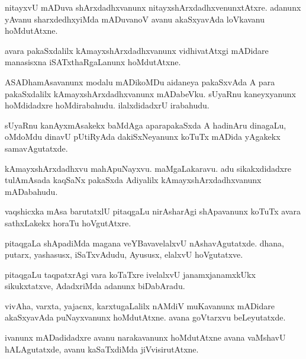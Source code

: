 \documentclass{article}
\begin{document}
\begin{mng}%
nitayxvU mADuva shArxdadhxvanunx nitayxshArxdadhxvenunxtAtxre. adanunx
yAvanu sharxdedhxyiMda mADuvanoV avanu akaSxyavAda loVkavanu
hoMdutAtxne.
\end{mng}

\begin{mng}%
avara pakaSxdalilx kAmayxshArxdadhxvanunx vidhivatAtxgi mADidare
manasisxna iSATxthaRgaLanunx hoMdutAtxne.
\end{mng}

\begin{mng}%
ASADhamAsavanunx modalu mADikoMDu aidaneya pakaSxvAda
A para pakaSxdalilx kAmayxshArxdadhxvanunx mADabeVku. sUyaRnu kaneyxyanunx
hoMdidadxre hoMdirabahudu. ilalxdidadxrU irabahudu.
\end{mng}

\begin{mng}%
sUyaRnu kanAyxmAsakekx baMdAga aparapakaSxda A hadinAru
dinagaLu, oMdoMdu dinavU pUtiRyAda dakiSxNeyanunx koTuTx mADida yAgakekx samavAgutatxde.
\end{mng}

\begin{mng}%
kAmayxshArxdadhxvu mahApuNayxvu. maMgaLakaravu. adu sikakxdidadxre
tulAmAsada kaqSaNx pakaSxda Adiyalilx kAmayxshArxdadhxvanunx mADabahudu.
\end{mng}

\begin{mng}%
vaqshicxka mAsa barutatxlU pitaqgaLu nirAsharAgi shApavanunx
koTuTx avara sathxLakekx horaTu hoVgutAtxre.
\end{mng}

\begin{mng}%
pitaqgaLa shApadiMda magana veYBavavelalxvU nAshavAgutatxde. dhana,
putarx, yashasusx, iSaTxvAdudu, Ayususx, elalxvU hoVgutatxve.
\end{mng}

\begin{mng}%
pitaqgaLu taqpatxrAgi vara koTaTxre ivelalxvU janamxjanamxkUkx sikukxtatxve,
AdadxriMda adanunx biDabAradu.
\end{mng}

\begin{mng}%
vivAha, varxta, yajacnx, karxtugaLalilx nAMdiV muKavanunx mADidare
akaSxyavAda puNayxvanunx hoMdutAtxne. avana goVtarxvu beLeyutatxde.
\end{mng}

\begin{mng}%
ivanunx mADadidadxre avanu narakavanunx hoMdutAtxne avana
vaMshavU hALAgutatxde, avanu kaSaTxdiMda jiVvisirutAtxne.
\end{mng}
\end{document}
